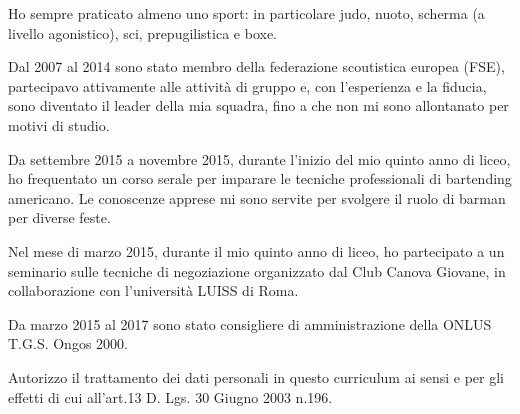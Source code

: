 \documentclass[10pt,a4paper]{altacv}
\begin{document}

\divider


Ho sempre praticato almeno uno sport: in particolare judo, nuoto, scherma (a livello agonistico), sci, prepugilistica e boxe.

\divider

Dal 2007 al 2014 sono stato membro della federazione scoutistica europea (FSE), partecipavo attivamente alle attività di gruppo e, con l'esperienza e la fiducia, sono diventato il leader della mia squadra, fino a che non mi sono allontanato per motivi di studio.

\divider

Da settembre 2015 a novembre 2015, durante l'inizio del mio quinto anno di liceo, ho frequentato un corso serale per imparare le tecniche professionali di bartending americano. Le conoscenze apprese mi sono servite per svolgere il ruolo di barman per diverse feste. 

\divider

Nel mese di marzo 2015, durante il mio quinto anno di liceo, ho partecipato a un seminario sulle tecniche di negoziazione organizzato dal Club Canova Giovane, in collaborazione con l'università LUISS di Roma.

\divider

Da marzo 2015 al 2017 sono stato consigliere di amministrazione della ONLUS T.G.S. Ongos 2000.





\medskip

\begin{fullwidth}
\small
Autorizzo il trattamento dei dati personali in questo curriculum ai sensi e per gli effetti di cui all’art.13 D. Lgs. 30 Giugno 2003 n.196.
\end{fullwidth}
\end{document}
